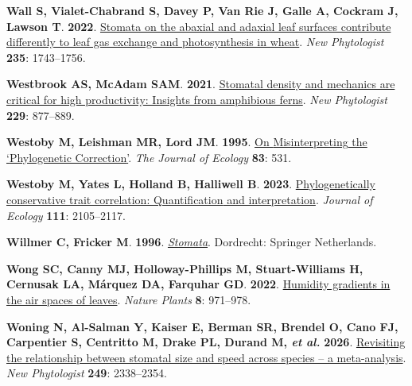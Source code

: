 \documentclass[
  letterpaper,
  DIV=11,
  numbers=noendperiod]{scrartcl}
\newlength{\cslhangindent}
\newenvironment{CSLReferences}[2] %
 {\begin{list}{}{%
  \setlength{\itemindent}{0pt}
  \setlength{\leftmargin}{0pt}
  \setlength{\parsep}{0pt}
  \ifodd #1
   \setlength{\leftmargin}{\cslhangindent}
   \setlength{\itemindent}{-1\cslhangindent}
  \fi
  \setlength{\itemsep}{#2\baselineskip}}}
 {\end{list}}
\begin{document}
\begin{CSLReferences}{0}{1}
\textbf{\textbf{Wall S}, \textbf{Vialet-Chabrand S}, \textbf{Davey P},
\textbf{Van Rie J}, \textbf{Galle A}, \textbf{Cockram J}, \textbf{Lawson
T}}. \textbf{2022}. \href{https://doi.org/10.1111/nph.18257}{Stomata on
the abaxial and adaxial leaf surfaces contribute differently to leaf gas
exchange and photosynthesis in wheat}. \emph{New Phytologist}
\textbf{235}: 1743--1756.

\textbf{\textbf{Westbrook AS}, \textbf{McAdam SAM}}. \textbf{2021}.
\href{https://doi.org/10.1111/nph.16850}{Stomatal density and mechanics
are critical for high productivity: Insights from amphibious ferns}.
\emph{New Phytologist} \textbf{229}: 877--889.

\textbf{\textbf{Westoby M}, \textbf{Leishman MR}, \textbf{Lord JM}}.
\textbf{1995}. \href{https://doi.org/10.2307/2261605}{On
{Misinterpreting} the {`{Phylogenetic Correction}'}}. \emph{The Journal
of Ecology} \textbf{83}: 531.

\textbf{\textbf{Westoby M}, \textbf{Yates L}, \textbf{Holland B},
\textbf{Halliwell B}}. \textbf{2023}.
\href{https://doi.org/10.1111/1365-2745.14150}{Phylogenetically
conservative trait correlation: {Quantification} and interpretation}.
\emph{Journal of Ecology} \textbf{111}: 2105--2117.

\textbf{\textbf{Willmer C}, \textbf{Fricker M}}. \textbf{1996}.
\emph{\href{https://doi.org/10.1007/978-94-011-0579-8}{Stomata}}.
Dordrecht: Springer Netherlands.

\textbf{\textbf{Wong SC}, \textbf{Canny MJ}, \textbf{Holloway-Phillips
M}, \textbf{Stuart-Williams H}, \textbf{Cernusak LA}, \textbf{Márquez
DA}, \textbf{Farquhar GD}}. \textbf{2022}.
\href{https://doi.org/10.1038/s41477-022-01202-1}{Humidity gradients in
the air spaces of leaves}. \emph{Nature Plants} \textbf{8}: 971--978.

\textbf{\textbf{Woning N}, \textbf{Al-Salman Y}, \textbf{Kaiser E},
\textbf{Berman SR}, \textbf{Brendel O}, \textbf{Cano FJ},
\textbf{Carpentier S}, \textbf{Centritto M}, \textbf{Drake PL},
\textbf{Durand M}, \emph{et al.}} \textbf{2026}.
\href{https://doi.org/10.1111/nph.70842}{Revisiting the relationship
between stomatal size and speed across species -- a meta-analysis}.
\emph{New Phytologist} \textbf{249}: 2338--2354.


\end{CSLReferences}
\end{document}
